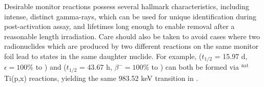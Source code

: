 Desirable monitor reactions 
possess several hallmark characteristics,  
including intense, distinct gamma-rays, 
which can be used for unique identification during post-activation assay, and lifetimes long enough to enable removal after a reasonable length irradiation.    
Care should also be taken to avoid cases where two radionuclides which are produced by two different reactions on the same monitor foil lead to states in the same daughter nuclide.  
For example,   ($t_{1/2}$ = 15.97 d, $\epsilon=100\%$ to ) and   ($t_{1/2}$ = 43.67 h, $\beta^-=100\%$ to ) can both be formed via $^\text{nat}$Ti(p,x) reactions, yielding the same 983.52 keV transition in  \cite{Burrows2006}.
